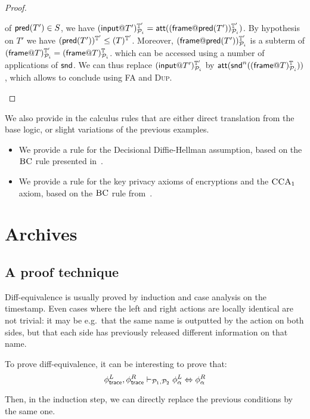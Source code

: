 \begin{proof}
\begin{itemize}
     of $\textsf{pred}(T') \in S$, we have
     $(\textsf{input} @ T')^{\mathbb{T}'}_{\mathcal{P}_i} =
      \mathsf{att}((\textsf{frame} @ \textsf{pred}(T'))^{\mathbb{T}'}_{\mathcal{P}_i})$.
     By hypothesis on $T'$ we have
     $(\textsf{pred}(T'))^{\mathbb{T}'}_{} \leq (T)^{\mathbb{T}'}_{}$.
     Moreover, $(\textsf{frame} @ \textsf{pred}(T'))^{\mathbb{T}'}_{\mathcal{P}_i}$
     is a subterm of $(\textsf{frame} @ T)^{\mathbb{T}'}_{\mathcal{P}_i} =
     (\textsf{frame} @ T)^{\mathbb{T}}_{\mathcal{P}_i}$.
     which can be accessed using a number of applications of $\mathsf{snd}$.
     We can thus replace
     $(\textsf{input} @ T')^{\mathbb{T}'}_{\mathcal{P}_i}$
     by $\mathsf{att}(\mathsf{snd}^n((\textsf{frame} @ T)^{\mathbb{T}}_{\mathcal{P}_i}))$,
     which allows to conclude using \textsc{FA} and \textsc{Dup}.
  \end{itemize}
\end{proof}

We also provide in the calculus rules that are either direct translation from the base logic, or slight variations of the previous examples.
\begin{itemize}
\item We provide a rule for the Decisional Diffie-Hellman assumption, based on the $\textsc{BC}$ rule presented in~\cite{bana2019verification}.
\item We provide a rule for the key privacy axioms of encryptions and the $\textsc{CCA}_1$ axiom, based on the $\textsc{BC}$ rule from~\cite{Bana:2014:CCS:2660267.2660276}.

\end{itemize}


\clearpage
\section{Archives}
\subsection{A proof technique}

Diff-equivalence is usually proved by induction and case analysis on
the timestamp. Even cases where the left and right actions are locally
identical are not trivial: it may be e.g.\ that the same name is outputted
by the action on both sides, but that each side has previously released
different information on that name.

To prove diff-equivalence, it can be interesting to prove that:
\[
  \phi^L_{\textsf{trace}}, \phi^R_{\textsf{trace}}
  \vdash_{\mathcal{P}_1,\mathcal{P}_2}
  \phi^L_\alpha \Leftrightarrow \phi^R_\alpha
\]

Then, in the induction step, we can directly replace the previous conditions by the same one.


